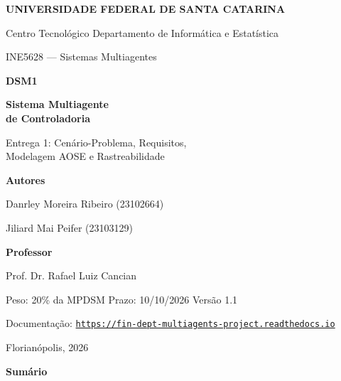 \documentclass[10pt,a4paper]{article}
\newcommand{\autorA}{Danrley Moreira Ribeiro}
\newcommand{\matA}{23102664}
\newcommand{\autorB}{Jiliard Mai Peifer}
\newcommand{\matB}{23103129}
\newcommand{\docsURL}{https://fin-dept-multiagents-project.readthedocs.io}
\newcommand{\versao}{1.1}
\begin{document}
\begin{titlepage}
\centering
{\large\bfseries UNIVERSIDADE FEDERAL DE SANTA CATARINA\par}
{\normalsize Centro Tecnológico \textbullet{} Departamento de Informática e Estatística\par}
{\normalsize INE5628 — Sistemas Multiagentes\par}
\vfill
{\fontsize{30}{36}\selectfont\bfseries DSM1\par}
\vspace{0.9cm}
{\fontsize{22}{28}\selectfont\bfseries Sistema Multiagente\\de Controladoria\par}
\vspace{0.7cm}
{\Large Entrega 1: Cenário-Problema, Requisitos,\\Modelagem AOSE e Rastreabilidade\par}
\vfill
{\large\bfseries Autores\par}\vspace{0.3cm}
{\large \autorA{} (\matA)\par \autorB{} (\matB)\par}
\vspace{1cm}
{\large\bfseries Professor\par}\vspace{0.3cm}
{\large Prof. Dr. Rafael Luiz Cancian\par}
\vfill
{\normalsize Peso: 20\% da MPDSM \textbullet{} Prazo: 10/10/2026 \textbullet{} Versão \versao\par}
\vspace{0.3cm}
{\normalsize Documentação: \href{\docsURL}{\texttt{\docsURL}}\par}
\vspace{0.8cm}
{\large Florianópolis, 2026\par}
\end{titlepage}

\thispagestyle{empty}
{\centering\fontsize{20}{24}\selectfont\bfseries Sumário\par}
\vspace{1.2cm}
\makeatletter{}\makeatother
\clearpage
\setcounter{page}{1}
\end{document}

